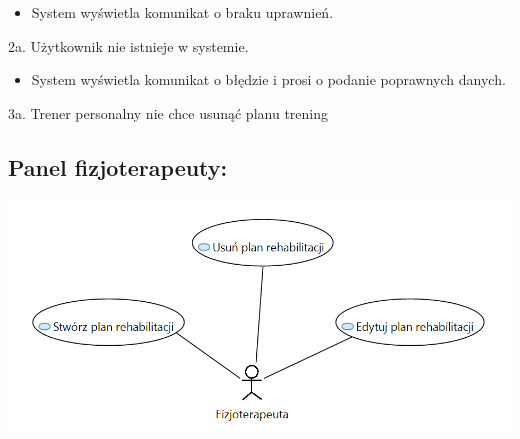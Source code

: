\documentclass[
]{article}
\providecommand{\tightlist}{%
  \setlength{\itemsep}{0pt}\setlength{\parskip}{0pt}}
\begin{document}
\begin{itemize}
\tightlist
\item
  {System wyświetla komunikat o braku uprawnień.}
\end{itemize}

{2a. Użytkownik nie istnieje w systemie.}

\begin{itemize}
\tightlist
\item
  {System wyświetla komunikat o błędzie i prosi o podanie poprawnych
  danych.}
\end{itemize}

{3a. Trener personalny nie chce usunąć planu trening}

{}

\hypertarget{h.tqqay39z8oku}{%
\subsection{\texorpdfstring{{}}{}}\label{h.tqqay39z8oku}}

{}

\hypertarget{h.vpvz4pfg93q6}{%
\subsection{\texorpdfstring{{}}{}}\label{h.vpvz4pfg93q6}}

{}

{}

{}

{}

{}

{}

{}

{}

{}

{}

\hypertarget{h.hgrtio46fsci}{%
\subsection{\texorpdfstring{{Panel
fizjoterapeuty:}}{Panel fizjoterapeuty:}}\label{h.hgrtio46fsci}}

{\includegraphics{diagrams/use_cases/fizjoterapeuta.png}}
\end{document}
